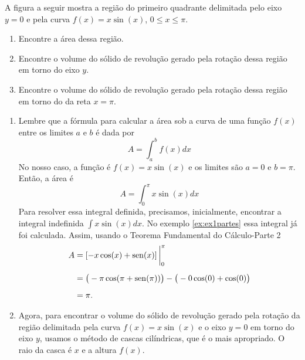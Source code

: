 \begin{example}
  A figura a seguir mostra a região do primeiro quadrante delimitada pelo eixo
  $y=0$ e pela curva $f(x)=x \sin(x)$, $0 \leq x \leq \pi$.
  \begin{enumerate}[label=\alph*)]
    \item Encontre a área dessa região.
    \item Encontre o volume do sólido de revolução gerado pela
          rotação dessa região em torno do eixo $y$.
    \item Encontre o volume do sólido de revolução gerado pela
          rotação dessa região em torno do da reta $x=\pi$.
  \end{enumerate}
\solution
\begin{enumerate}[label=\alph*)]

\item
  Lembre que a fórmula para calcular a área sob a curva de uma função
  $f(x)$ entre os limites $a$ e $b$ é dada por
  \[
    A = \int_a^b f(x)dx
  \]
  No nosso caso, a função é $f(x) = x \sin(x)$ e os limites são $a=0$ e $b=\pi$.
  Então, a área é
  \[
    A = \int_0^{\pi} x\sin(x)dx
  \]
  Para resolver essa integral definida, precisamos, inicialmente,
  encontrar a integral indefinida $\int x\sin(x)dx$.
  No exemplo \ref{ex:ex1partes} essa integral já foi calculada.
  Assim, usando o Teorema Fundamental do Cálculo-Parte 2
  \begin{align*}
    A
    & = \left[ -x \cos(x) + \operatorname{sen}(x) \right] \bigg\rvert_{0}^{\pi} \\[2mm]
    & = \big(-\pi\cos(\pi+ \operatorname{sen}(\pi))\big)
      - \big(-0\cos(0)+ \cos(0)\big) \\[2mm]
    & =\pi.
  \end{align*}

  \item
  Agora, para encontrar o volume do sólido de revolução gerado pela rotação
  da região delimitada pela curva \(f(x) = x \sin(x)\) e o eixo \(y = 0\)
  em torno do eixo \(y\), usamos o método de cascas cilíndricas, que é
  o mais apropriado. O raio da casca é $x$ e a altura $f(x)$.


\end{enumerate}
\end{example}
